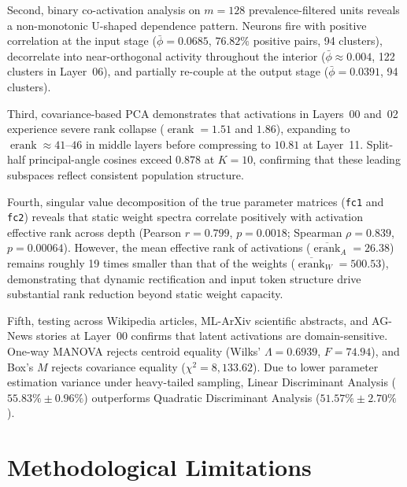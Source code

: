 \documentclass[12pt, a4paper, oneside]{report}
\theoremstyle{definition}
\newcommand{\erank}{\operatorname{erank}}
\begin{document}
Second, binary co-activation analysis on $m = 128$ prevalence-filtered units reveals a non-monotonic U-shaped dependence pattern. Neurons fire with positive correlation at the input stage ($\bar{\phi} = 0.0685$, $76.82\%$ positive pairs, 94 clusters), decorrelate into near-orthogonal activity throughout the interior ($\bar{\phi} \approx 0.004$, 122 clusters in Layer~06), and partially re-couple at the output stage ($\bar{\phi} = 0.0391$, 94 clusters).

Third, covariance-based PCA demonstrates that activations in Layers~00 and~02 experience severe rank collapse ($\erank = 1.51$ and $1.86$), expanding to $\erank \approx 41\text{--}46$ in middle layers before compressing to $10.81$ at Layer~11. Split-half principal-angle cosines exceed $0.878$ at $K = 10$, confirming that these leading subspaces reflect consistent population structure.

Fourth, singular value decomposition of the true parameter matrices (\texttt{fc1} and \texttt{fc2}) reveals that static weight spectra correlate positively with activation effective rank across depth (Pearson $r = 0.799$, $p = 0.0018$; Spearman $\rho = 0.839$, $p = 0.00064$). However, the mean effective rank of activations ($\overline{\erank}_A = 26.38$) remains roughly 19 times smaller than that of the weights ($\overline{\erank}_W = 500.53$), demonstrating that dynamic rectification and input token structure drive substantial rank reduction beyond static weight capacity.

Fifth, testing across Wikipedia articles, ML-ArXiv scientific abstracts, and AG-News stories at Layer~00 confirms that latent activations are domain-sensitive. One-way MANOVA rejects centroid equality (Wilks' $\Lambda = 0.6939$, $F = 74.94$), and Box's $M$ rejects covariance equality ($\chi^2 = 8{,}133.62$). Due to lower parameter estimation variance under heavy-tailed sampling, Linear Discriminant Analysis ($55.83\% \pm 0.96\%$) outperforms Quadratic Discriminant Analysis ($51.57\% \pm 2.70\%$).

\section{Methodological Limitations}
\end{document}
